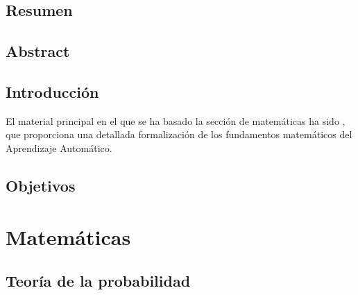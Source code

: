 \documentclass[a4paper,11pt]{report}
\begin{document}

\makeatletter
\makeatother


\chapter*{Resumen}
  
\chapter*{Abstract}
  

\setcounter{tocdepth}{1}
\tableofcontents

\break 

\setcounter{page}{1}


\makeatletter
\makeatother


\chapter*{Introducción}
  El material principal en el que se ha basado la sección de matemáticas ha sido \cite{shwartz_understanding_ml}, 
  que proporciona una detallada formalización de los fundamentos matemáticos del Aprendizaje Automático.
\chapter*{Objetivos}

\part{Matemáticas}  
  \chapter{Teoría de la probabilidad}
    
\end{document}
